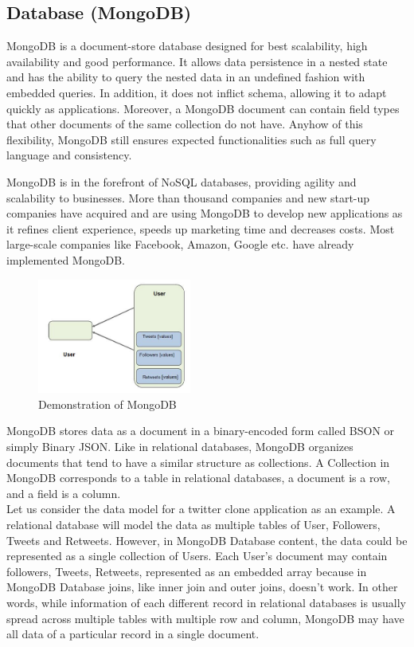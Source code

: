 \documentclass[conference]{IEEEtran}
\begin{document}
\subsection{\textbf{Database (MongoDB)}}
MongoDB is a document-store database designed for best scalability, high availability and good performance. It allows data persistence in a nested state and has the ability to query the nested data in an undefined fashion with embedded queries. In addition, it does not inflict schema, allowing it to adapt quickly as applications. Moreover, a MongoDB document can contain field types that other documents of the same collection do not have. Anyhow of this flexibility, MongoDB still ensures expected functionalities such as full query language and consistency.

MongoDB is in the forefront of NoSQL databases, providing agility and scalability to businesses. More than thousand companies and new start-up companies have acquired and are using MongoDB to develop new applications as it refines client experience, speeds up marketing time and decreases costs. Most large-scale companies like Facebook, Amazon, Google etc. have already implemented MongoDB. \\

\begin{figure}[!ht]
	\centering
	\includegraphics[width=0.45\textwidth]{mongo.png}
	\caption{Demonstration of MongoDB\cite{b6}}
\end{figure}

MongoDB stores data as a document in a binary-encoded form called BSON or simply Binary JSON. Like in relational databases, MongoDB organizes documents that tend to have a similar structure as collections. A Collection in MongoDB corresponds to a table in relational databases, a document is a row, and a field is a column.\\

Let us consider the data model for a twitter clone application as an example. A relational database will model the data as multiple tables of User, Followers, Tweets and Retweets. However, in MongoDB Database content, the data could be represented as a single collection of Users. Each User’s document may contain followers, Tweets, Retweets, represented as an embedded array because in MongoDB Database joins, like inner join and outer joins, doesn't work. In other words, while information of each different record in relational databases is usually spread across multiple tables with multiple row and column, MongoDB may have all data of a particular record in a single document.
\end{document}
